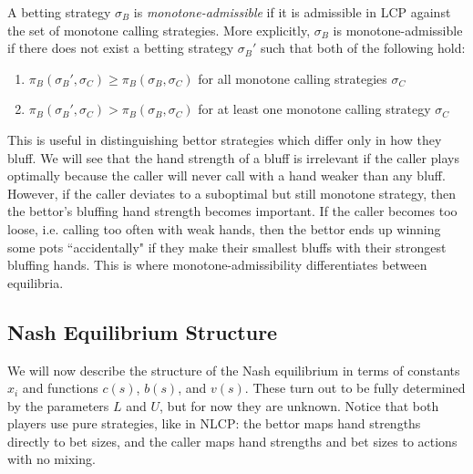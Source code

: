\documentclass[../../main/main.tex]{subfiles}
\begin{document}
\begin{definition}
    A betting strategy $\sigma_B$ is \textit{monotone-admissible} if it is admissible in LCP against the set of monotone calling strategies. More explicitly, $\sigma_B$ is monotone-admissible if there does not exist a betting strategy $\sigma_B'$ such that both of the following hold:
    \begin{enumerate}
        \item $\pi_B(\sigma_B',\sigma_C) \geq \pi_B(\sigma_B,\sigma_C)$ for all monotone calling strategies $\sigma_C$
        \item $\pi_B(\sigma_B',\sigma_C) > \pi_B(\sigma_B,\sigma_C)$ for at least one monotone calling strategy $\sigma_C$
    \end{enumerate}
\end{definition}

This is useful in distinguishing bettor strategies which differ only in how they bluff. We will see that the hand strength of a bluff is irrelevant if the caller plays optimally because the caller will never call with a hand weaker than any bluff. However, if the caller deviates to a suboptimal but still monotone strategy, then the bettor's bluffing hand strength becomes important. If the caller becomes too loose, i.e. calling too often with weak hands, then the bettor ends up winning some pots ``accidentally" if they make their smallest bluffs with their strongest bluffing hands. This is where monotone-admissibility differentiates between equilibria.

\subsection{Nash Equilibrium Structure}

We will now describe the structure of the Nash equilibrium in terms of constants $x_i$ and functions $c(s)$, $b(s)$, and $v(s)$. These turn out to be fully determined by the parameters $L$ and $U$, but for now they are unknown. Notice that both players use pure strategies, like in NLCP: the bettor maps hand strengths directly to bet sizes, and the caller maps hand strengths and bet sizes to actions with no mixing.
\end{document}
